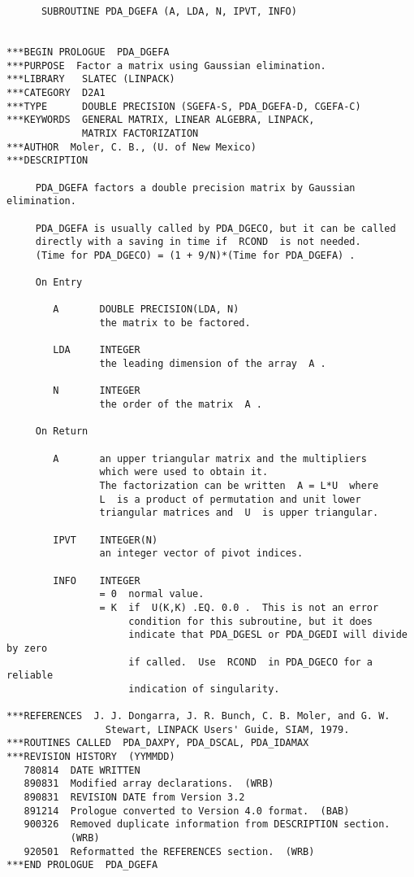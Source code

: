 \begin{verbatim}
      SUBROUTINE PDA_DGEFA (A, LDA, N, IPVT, INFO)


***BEGIN PROLOGUE  PDA_DGEFA
***PURPOSE  Factor a matrix using Gaussian elimination.
***LIBRARY   SLATEC (LINPACK)
***CATEGORY  D2A1
***TYPE      DOUBLE PRECISION (SGEFA-S, PDA_DGEFA-D, CGEFA-C)
***KEYWORDS  GENERAL MATRIX, LINEAR ALGEBRA, LINPACK,
             MATRIX FACTORIZATION
***AUTHOR  Moler, C. B., (U. of New Mexico)
***DESCRIPTION

     PDA_DGEFA factors a double precision matrix by Gaussian elimination.

     PDA_DGEFA is usually called by PDA_DGECO, but it can be called
     directly with a saving in time if  RCOND  is not needed.
     (Time for PDA_DGECO) = (1 + 9/N)*(Time for PDA_DGEFA) .

     On Entry

        A       DOUBLE PRECISION(LDA, N)
                the matrix to be factored.

        LDA     INTEGER
                the leading dimension of the array  A .

        N       INTEGER
                the order of the matrix  A .

     On Return

        A       an upper triangular matrix and the multipliers
                which were used to obtain it.
                The factorization can be written  A = L*U  where
                L  is a product of permutation and unit lower
                triangular matrices and  U  is upper triangular.

        IPVT    INTEGER(N)
                an integer vector of pivot indices.

        INFO    INTEGER
                = 0  normal value.
                = K  if  U(K,K) .EQ. 0.0 .  This is not an error
                     condition for this subroutine, but it does
                     indicate that PDA_DGESL or PDA_DGEDI will divide by zero
                     if called.  Use  RCOND  in PDA_DGECO for a reliable
                     indication of singularity.

***REFERENCES  J. J. Dongarra, J. R. Bunch, C. B. Moler, and G. W.
                 Stewart, LINPACK Users' Guide, SIAM, 1979.
***ROUTINES CALLED  PDA_DAXPY, PDA_DSCAL, PDA_IDAMAX
***REVISION HISTORY  (YYMMDD)
   780814  DATE WRITTEN
   890831  Modified array declarations.  (WRB)
   890831  REVISION DATE from Version 3.2
   891214  Prologue converted to Version 4.0 format.  (BAB)
   900326  Removed duplicate information from DESCRIPTION section.
           (WRB)
   920501  Reformatted the REFERENCES section.  (WRB)
***END PROLOGUE  PDA_DGEFA
\end{verbatim}

